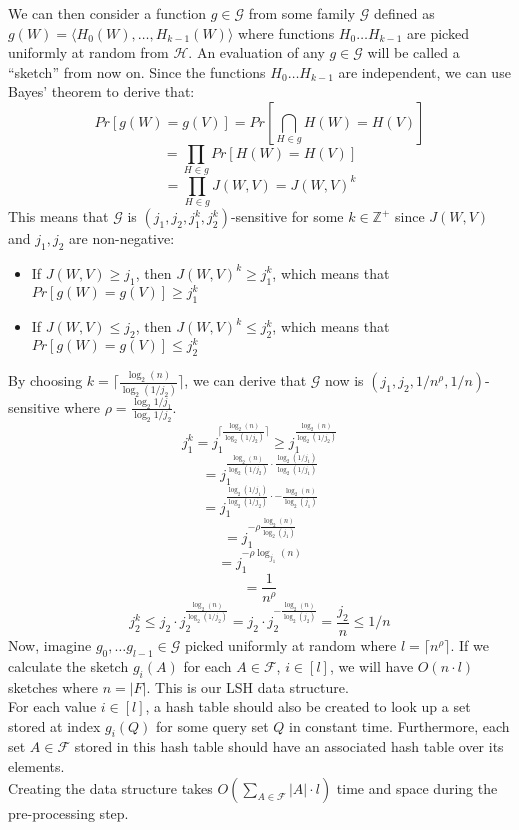 We can then consider a function $g \in \mathcal{G}$ from some family $\mathcal{G}$ defined as $g(W) = \langle H_0(W), \dots, H_{k-1}(W) \rangle$ where functions $H_0 \dots H_{k-1}$ are picked uniformly at random from $\mathcal{H}$. An evaluation of any $g\in \mathcal{G}$ will be called a ``sketch'' from now on. Since the functions $H_0 \dots H_{k-1}$ are independent, we can use Bayes' theorem to derive that:
$$Pr[g(W)=g(V)] = Pr[\bigcap_{H \in g}H(W) = H(V)]$$
$$=\prod_{H\in g}Pr[H(W) = H(V)]$$
$$=\prod_{H\in g}J(W,V)=J(W,V)^k$$
This means that $\mathcal{G}$ is $(j_1, j_2, j_1^k, j_2^k)$-sensitive for some $k\in \mathbb{Z}^+$ since $J(W,V)$ and $j_1, j_2$ are non-negative:
\begin{itemize}
    \item If $J(W,V) \geq j_1$, then $J(W,V)^k \geq j_1^k$, which means that $Pr[g(W)=g(V)] \geq j_1^k$
    \item If $J(W,V) \leq j_2$, then $J(W,V)^k \leq j_2^k$, which means that $Pr[g(W)=g(V)] \leq j_2^k$
\end{itemize}
By choosing $k=\lceil \frac{\log_2(n)}{\log_2(1/j_2)} \rceil$, we can derive that $\mathcal{G}$ now is $(j_1, j_2, 1/n^\rho, 1/n)$-sensitive where $\rho=\frac{\log_2{1/j_1}}{\log_2{1/j_2}}$.
$$j_1^k = j_1^{\lceil\frac{\log_2(n)}{\log_2(1/j_2)} \rceil}\geq j_1^{\frac{\log_2(n)}{\log_2(1/j_2)}}$$
$$=j_1^{\frac{\log_2{(n)}}{\log_2{(1/j_2)}}\cdot\frac{\log_2{(1/j_1)}}{\log_2{(1/j_1)}}}$$
$$=j_1^{\frac{\log_2{(1/j_1)}}{\log_2{(1/j_2)}}\cdot-\frac{\log_2{(n)}}{\log_2{(j_1)}}}$$
$$=j_1^{-\rho\frac{\log_2{(n)}}{\log_2{(j_1)}}}$$
$$=j_1^{-\rho\log_{j_1}{(n)}}$$
$$=\frac{1}{n^\rho}$$
$$j_2^k\leq j_2 \cdot j_2^{\frac{\log_2(n)}{\log_2(1/j_2)}}=j_2\cdot j_2^{-\frac{\log_2{(n)}}{\log_2{(j_2)}}}=\frac{j_2}{n}\leq 1/n$$
Now, imagine $g_0, \dots g_{l-1} \in \mathcal{G}$ picked uniformly at random where $l=\lceil n^\rho \rceil$. If we calculate the sketch $g_i(A)$ for each $A\in \mathcal{F}$, $i\in [l]$, we will have $O(n\cdot l)$ sketches where $n=|F|$. This is our LSH data structure.\\
For each value $i\in [l]$, a hash table should also be created to look up a set stored at index $g_i(Q)$ for some query set $Q$ in constant time.
Furthermore, each set $A\in \mathcal{F}$ stored in this hash table should have an associated hash table over its elements.\\
Creating the data structure takes $O(\sum_{A\in \mathcal{F}}|A| \cdot l)$ time and space during the pre-processing step.\\
